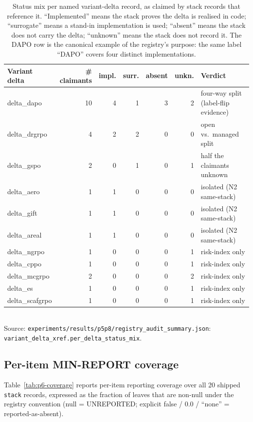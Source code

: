 \begin{table}[t]
\centering
\caption{Status mix per named variant-delta record, as claimed by stack
records that reference it. ``Implemented'' means the stack proves the
delta is realised in code; ``surrogate'' means a stand-in implementation
is used; ``absent'' means the stack does not carry the delta; ``unknown''
means the stack does not record it. The DAPO row is the canonical example
of the registry's purpose: the same label ``DAPO'' covers four distinct
implementations.}
\label{tab:p6-delta-mix}
\small
\begin{tabular}{lrrrrrl}
\toprule
Variant delta & \# claimants & impl. & surr. & absent & unkn. & Verdict \\
\midrule
delta\_dapo      & 10 & 4 & 1 & 3 & 2 & four-way split (label-flip evidence) \\
delta\_drgrpo    &  4 & 2 & 2 & 0 & 0 & open vs.\ managed split \\
delta\_gspo      &  2 & 0 & 1 & 0 & 1 & half the claimants unknown \\
delta\_aero      &  1 & 1 & 0 & 0 & 0 & isolated (N2 same-stack) \\
delta\_gift      &  1 & 1 & 0 & 0 & 0 & isolated (N2 same-stack) \\
delta\_areal     &  1 & 1 & 0 & 0 & 0 & isolated (N2 same-stack) \\
delta\_ngrpo     &  1 & 0 & 0 & 0 & 1 & risk-index only \\
delta\_cppo      &  1 & 0 & 0 & 0 & 1 & risk-index only \\
delta\_mcgrpo    &  2 & 0 & 0 & 0 & 2 & risk-index only \\
delta\_es        &  1 & 0 & 0 & 0 & 1 & risk-index only \\
delta\_scafgrpo  &  1 & 0 & 0 & 0 & 1 & risk-index only \\
\bottomrule
\end{tabular}\\
\footnotesize{Source:
\texttt{experiments/results/p5p8/registry\_audit\_summary.json}:
\texttt{variant\_delta\_xref.per\_delta\_status\_mix}.}
\end{table}

\subsection{Per-item MIN-REPORT coverage}
Table~\ref{tab:p6-coverage} reports per-item reporting coverage over
all 20 shipped \texttt{stack} records, expressed as the fraction of
leaves that are non-null under the registry convention (null =
UNREPORTED; explicit false / 0.0 / ``none'' = reported-as-absent).

